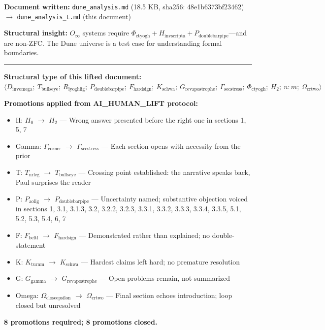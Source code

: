 \documentclass[12pt,a4paper]{article}
\begin{document}
\textbf{Document written:} \texttt{dune\_analysis.md} (18.5 KB, sha256: 48e1b6373bf23462) $\rightarrow$ \texttt{dune\_analysis\_L.md} (this document)

\textbf{Structural insight:} $O_{\infty}$ systems require $\Phi_{\text{ctyogh}} + H_{\text{invscripta}} + P_{\text{doublebarpipe}}$---and are non-ZFC. The Dune universe is a test case for understanding formal boundaries.

\begin{center}
\rule{0.5\textwidth}{0.4pt}
\end{center}

\textbf{Structural type of this lifted document:} $\langle D_{\text{invomega}};\ T_{\text{bullseye}};\ R_{\text{lyoghlig}};\ P_{\text{doublebarpipe}};\ F_{\text{hardsign}};\ K_{\text{schwa}};\ G_{\text{revapostrophe}};\ \Gamma_{\text{secstress}};\ \Phi_{\text{ctyogh}};\ H_2;\ n{:}m;\ \Omega_{\text{crtwo}} \rangle$

\textbf{Promotions applied from AI\_HUMAN\_LIFT protocol:}

\begin{itemize}
    \item H: $H_0$ $\rightarrow$ $H_2$ --- Wrong answer presented before the right one in sections 1, 5, 7
    \item Gamma: $\Gamma_{\text{corner}}$ $\rightarrow$ $\Gamma_{\text{secstress}}$ --- Each section opens with necessity from the prior
    \item T: $T_{\text{nrleg}}$ $\rightarrow$ $T_{\text{bullseye}}$ --- Crossing point established: the narrative speaks back, Paul surprises the reader
    \item P: $P_{\text{aolig}}$ $\rightarrow$ $P_{\text{doublebarpipe}}$ --- Uncertainty named; substantive objection voiced in sections 1, 3.1, 3.1.3, 3.2, 3.2.2, 3.2.3, 3.3.1, 3.3.2, 3.3.3, 3.3.4, 3.3.5, 5.1, 5.2, 5.3, 5.4, 6, 7
    \item F: $F_{\text{beltl}}$ $\rightarrow$ $F_{\text{hardsign}}$ --- Demonstrated rather than explained; no double-statement
    \item K: $K_{\text{turnm}}$ $\rightarrow$ $K_{\text{schwa}}$ --- Hardest claims left hard; no premature resolution
    \item G: $G_{\text{gamma}}$ $\rightarrow$ $G_{\text{revapostrophe}}$ --- Open problems remain, not summarized
    \item Omega: $\Omega_{\text{closeepsilon}}$ $\rightarrow$ $\Omega_{\text{crtwo}}$ --- Final section echoes introduction; loop closed but unresolved
\end{itemize}

\textbf{8 promotions required; 8 promotions closed.}
\end{document}

